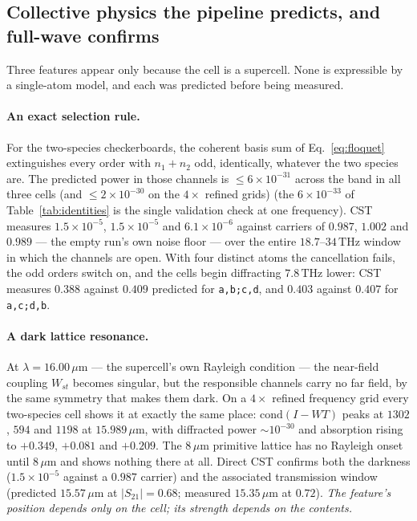 \documentclass[11pt,a4paper]{article}
\newcommand{\um}{\ensuremath{\,\mu\mathrm{m}}}
\newcommand{\THz}{\ensuremath{\,\mathrm{THz}}}
\theoremstyle{plain}
\theoremstyle{definition}
\begin{document}
\subsection{Collective physics the pipeline predicts, and full-wave confirms}
\label{sec:collective}

Three features appear only because the cell is a supercell. None is expressible
by a single-atom model, and each was predicted before being measured.

\paragraph{An exact selection rule.} For the two-species checkerboards, the
coherent basis sum of Eq.~\eqref{eq:floquet} extinguishes every order with
$n_1 + n_2$ odd, identically, whatever the two species are. The predicted power
in those channels is $\le 6\times10^{-31}$ across the band in all three cells (and $\le 2\times10^{-30}$ on the $4\times$ refined grids)
(the $6\times10^{-33}$ of Table~\ref{tab:identities} is the single validation
check at one frequency). CST measures $1.5\times10^{-5}$,
$1.5\times10^{-5}$ and $6.1\times10^{-6}$ against carriers of $0.987$, $1.002$
and $0.989$ --- the empty run's own noise floor --- over the entire
$18.7$--$34\THz$ window in which the channels are open. With four distinct atoms
the cancellation fails, the odd orders switch on, and the cells begin diffracting
$7.8\THz$ lower: CST measures $0.388$ against $0.409$ predicted for
\texttt{a,b;c,d}, and $0.403$ against $0.407$ for \texttt{a,c;d,b}.

\paragraph{A dark lattice resonance.} At $\lambda = 16.00\um$ --- the supercell's
own Rayleigh condition --- the near-field coupling $W_{st}$ becomes singular, but
the responsible channels carry no far field, by the same symmetry that makes them
dark. On a $4\times$ refined frequency grid every two-species cell shows it at
exactly the same place: $\mathrm{cond}(I - WT)$ peaks at $1302$, $594$ and $1198$
at $15.989\um$, with diffracted power $\sim\!10^{-30}$ and absorption rising to
$+0.349$, $+0.081$ and $+0.209$. The $8\um$ primitive lattice has no Rayleigh
onset until $8\um$ and shows nothing there at all. Direct CST confirms both the
darkness ($1.5\times10^{-5}$ against a $0.987$ carrier) and the associated
transmission window (predicted $15.57\um$ at $|S_{21}| = 0.68$; measured
$15.35\um$ at $0.72$). \emph{The feature's position depends only on the cell; its
strength depends on the contents.}
\end{document}
